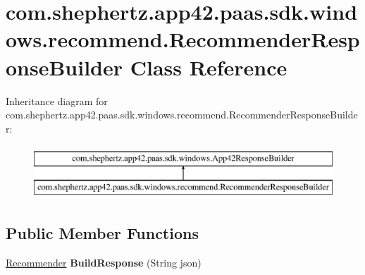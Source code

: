 \hypertarget{classcom_1_1shephertz_1_1app42_1_1paas_1_1sdk_1_1windows_1_1recommend_1_1_recommender_response_builder}{\section{com.\+shephertz.\+app42.\+paas.\+sdk.\+windows.\+recommend.\+Recommender\+Response\+Builder Class Reference}
\label{classcom_1_1shephertz_1_1app42_1_1paas_1_1sdk_1_1windows_1_1recommend_1_1_recommender_response_builder}
}
Inheritance diagram for com.\+shephertz.\+app42.\+paas.\+sdk.\+windows.\+recommend.\+Recommender\+Response\+Builder\+:\begin{figure}[H]
\begin{center}
\leavevmode
\includegraphics[height=2.000000cm]{classcom_1_1shephertz_1_1app42_1_1paas_1_1sdk_1_1windows_1_1recommend_1_1_recommender_response_builder}
\end{center}
\end{figure}
\subsection*{Public Member Functions}
\begin{DoxyCompactItemize}
\item 
\hypertarget{classcom_1_1shephertz_1_1app42_1_1paas_1_1sdk_1_1windows_1_1recommend_1_1_recommender_response_builder_a226144547ee0a687d22b4fe1998d1000}{\hyperlink{classcom_1_1shephertz_1_1app42_1_1paas_1_1sdk_1_1windows_1_1recommend_1_1_recommender}{Recommender} {\bfseries Build\+Response} (String json)}\label{classcom_1_1shephertz_1_1app42_1_1paas_1_1sdk_1_1windows_1_1recommend_1_1_recommender_response_builder_a226144547ee0a687d22b4fe1998d1000}

\end{DoxyCompactItemize}

